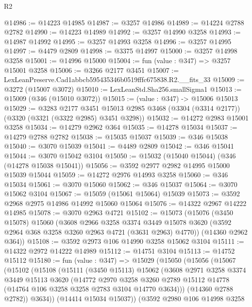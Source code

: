 \begin{lexlean}{R2}
\begin{coremodule}
@14986 := @14223 @14985
@14987 := @3257 @14986
@14989 := @14224 @2788 @2782
@14990 := @14223 @14989
@14992 := @3257 @14990 @3258
@14993 := @14987 @14992
@14995 := @3257 @14993 @3258
@14996 := @3257 @14995
@14997 := @4479 @2809
@14998 := @3375 @14997
@15000 := @3257 @14998 @3258
@15001 := @14996 @15000
@15004 := fun (value : @347) => @3257 @15001 @3258
@15006 := @3266 @2177 @3451
@15007 := LexLeanPreserve.Cad1abbcb595435346b0519fffc675838.R2.__fits_33
@15009 := @3272 (@15007 @3072)
@15010 := LexLeanStd.Sha256.smallSigma1
@15013 := @15009 (@346 (@15010 @3072))
@15015 := (value : @347) -> @15006 @15013
@15029 := @3283
    @2177
    @3451
    @15013
    @2985
    @3468
    (@3304 (@3314 @2177))
    (@3320 (@3321 (@3322 @2985) @3451 @3298))
@15032 := @14272 @2983 @15001 @3258
@15034 := @14279 @2962 @364
@15035 := @14278 @15034
@15037 := @14279 @2788 @2782
@15038 := @15035 @15037
@15039 := @346 @15038
@15040 := @3070 @15039
@15041 := @4489 @2809
@15042 := @346 @15041
@15044 := @3070 @15042 @3104
@15050 := @15032 (@15040 @15044) (@346 (@14278 @15038 @15041))
@15056 := @3592 @2977 @2982 @14995 @15000 @15039 @15044
@15059 := @14272 @2976 @14993 @3258
@15060 := @346 @15034
@15061 := @3070 @15060
@15062 := @346 @15037
@15064 := @3070 @15062 @3104
@15067 := @15059 (@15061 @15064) @15039
@15073 := @3592 @2968 @2975 @14986 @14992 @15060 @15064
@15076 := @14322 @2967 @14222 @14985
@15078 := @3070 @2963 @4721
@15102 := @15073
    (@15076
      (@3450 @15078)
      @15060
      (@3608
        @2966
        @3258
        @3374
        @3449
        @15078
        @3620
        (@3592 @2964 @368 @3258 @3260 @2963 @4721 (@3631 @2963) @4770))
      (@14360 @2962 @364))
@15108 := @3592 @2973 @106 @14990 @3258 @15062 @3104
@15111 := @14322 @2972 @14222 @14989
@15112 := @14751 @3104
@15113 := @14752 @15112
@15180 := fun (value : @347) =>
  @15029
    (@15050
      (@15056
        (@15067
          (@15102
            (@15108
              (@15111
                (@3450 @15113)
                @15062
                (@3608
                  @2971
                  @3258
                  @3374
                  @3449
                  @15113
                  @3620
                  (@14772
                    @2970
                    @3258
                    @3260
                    @2789
                    @15112
                    @14778
                    (@14764 @106 @3258 @3258 @2783 @3104 @14770 @3634)))
                (@14360 @2788 @2782))
              @3634))
          (@14414 @15034 @15037))
        (@3592
          @2980
          @106
          @14998
          @3258

\end{coremodule}
\end{lexlean}
